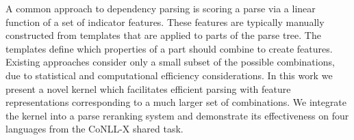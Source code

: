 A common approach to dependency parsing is scoring a parse via a linear function of a set of indicator features. These features are typically manually constructed from templates that are applied to parts of the parse tree. The templates define which properties of a part should combine to create features. Existing approaches consider only a small subset of the possible combinations, due to statistical and computational efficiency considerations. In this work we present a novel kernel which facilitates efficient parsing with feature representations corresponding to a much larger set of combinations. We integrate the kernel into a parse reranking system and demonstrate its effectiveness on four languages from the CoNLL-X shared task.
